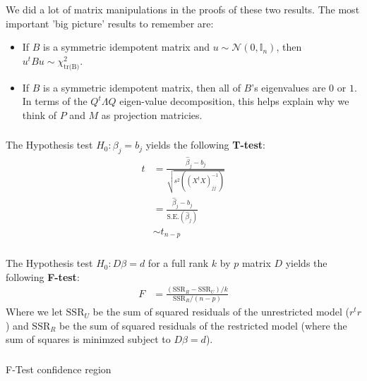 \begin{frame}[fragile] \frametitle{}

We did a lot of matrix manipulations in the proofs of these
two results. The most important 'big picture' results to
remember are:

\begin{itemize}
\item If $B$ is a symmetric idempotent matrix and
$u \sim \mathcal{N} (0, \mathbb{I}_n)$, then
$u^t B u \sim \chi^2_{\text{tr(B)}}$. \pause
\item If $B$ is a symmetric idempotent matrix, then
all of $B$'s eigenvalues are $0$ or $1$. In terms of
the $Q^t \Lambda Q$ eigen-value decomposition, this
helps explain why we think of $P$ and $M$ as projection
matricies.
\end{itemize}

\end{frame}


\begin{frame}[fragile] \frametitle{}

The Hypothesis test $H_0: \beta_j = b_j$ yields the
following {\bf T-test}:
\begin{align*}
t &= \frac{\widehat{\beta}_j - b_j}{\sqrt{s^2  \left( (X^t X)^{-1}_{jj} \right)}} \\
&= \frac{\widehat{\beta}_j - b_j}{\text{S.E.}(\widehat{\beta}_j)} \\
&\sim t_{n-p}
\end{align*}

\end{frame}


\begin{frame}[fragile] \frametitle{}

The Hypothesis test $H_0: D\beta = d$ for a full rank $k$ by $p$ matrix
$D$ yields the following {\bf F-test}:
\begin{align*}
F &= \frac{(\text{SSR}_R -  \text{SSR}_U) / k }{\text{SSR}_R / (n - p)}
\end{align*}
Where we let $\text{SSR}_U$ be the sum of squared residuals of the unrestricted
model ($r^t r$) and $\text{SSR}_R$ be the sum of squared residuals of the
restricted model (where the sum of squares is minimzed subject
to $D\beta = d$).

\end{frame}

\begin{frame}[fragile] \frametitle{}

\begin{flushright}
{\color{yaleblue}\sc\fontsize{1cm}{0cm}\selectfont F-Test confidence region}
\end{flushright}

\end{frame}

